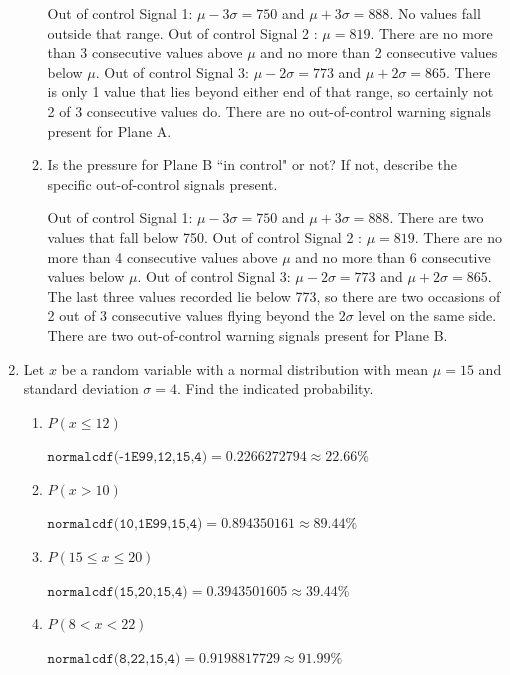 \documentclass[11pt]{article}
\newcommand{\answer}[1]{\color{white}#1}
\begin{document}
\begin{enumerate}
\begin{enumerate}
	{\answer Out of control Signal 1: $\mu -3\sigma = 750$ and $\mu +3\sigma = 888$.  No values fall outside that range. Out of control Signal 2 : $\mu = 819$.  There are no more than 3 consecutive values above $\mu$ and no more than 2 consecutive values below $\mu$. Out of control Signal 3: $\mu -2\sigma = 773$ and $\mu +2\sigma = 865$.  There is only 1 value that lies beyond either end of that range, so certainly not 2 of 3 consecutive values do. There are no out-of-control warning signals present for Plane A.} 
	
	\item  Is the pressure for Plane B ``in control" or not?  If not, describe the specific out-of-control signals present.
	
	{\answer Out of control Signal 1: $\mu -3\sigma = 750$ and $\mu +3\sigma = 888$.  There are two values that fall below 750. Out of control Signal 2 : $\mu = 819$.  There are no more than 4 consecutive values above $\mu$ and no more than 6 consecutive values below $\mu$. Out of control Signal 3: $\mu -2\sigma = 773$ and $\mu +2\sigma = 865$.  The last three values recorded lie below 773, so there are two occasions of 2 out of 3 consecutive values flying beyond the $2\sigma$ level on the same side. There are two out-of-control warning signals present for Plane B.} 

	\end{enumerate}
	

\item Let $x$ be a random variable with a normal distribution with mean $\mu = 15$ and standard deviation $\sigma = 4$.  Find the indicated probability.

	\begin{enumerate}
	\item $P(x \leq 12)$ 
	
	{\answer $\texttt{normalcdf(-1E99,12,15,4)} =  0.2266272794 \approx 22.66\%$
	} 
	
	\item $P(x > 10)$ 
	
	{\answer $\texttt{normalcdf(10,1E99,15,4)} =  0.894350161 \approx 89.44\%$
	} 
	
	\item $P(15 \leq x \leq 20)$ 
	
	{\answer $\texttt{normalcdf(15,20,15,4)} =  0.3943501605 \approx 39.44\%$
	} 
	
	\item $P(8 < x < 22)$ 
	
	{\answer $\texttt{normalcdf(8,22,15,4)} =  0.9198817729 \approx 91.99\%$
	} 
	\end{enumerate}


\end{enumerate}
\end{document}
